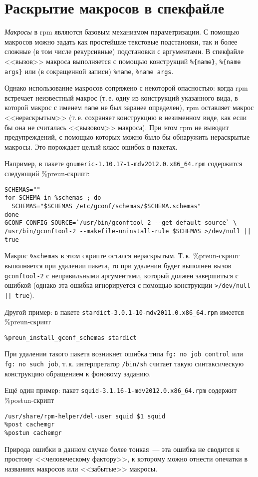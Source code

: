 \documentclass[russian,a4paper,12pt,titlepage]{article}
\begin{document}
\section{Раскрытие макросов в спекфайле}
\textit{Макросы} в rpm являются базовым механизмом параметризации.  С помощью
макросов можно задать как простейшие текстовые подстановки, так и более сложные
(в том числе рекурсивные) подстановки с аргументами.  В спекфайле <<вызов>> макроса
выполняется с помощью конструкций \verb|%{name}|, \verb|%{name args}| или (в сокращенной записи)
\verb|%name|, \verb|%name args|.

Однако использование макросов сопряжено с некоторой опасностью: когда rpm встречает неизвестный макрос
(т.\,е. одну из конструкций указанного вида, в которой макрос с именем \verb|name| не был заранее определен),
rpm оставляет макрос <<нераскрытым>> (т.\,е. сохраняет конструкцию в незименном виде, как если бы она не считалась
<<вызовом>> макроса).  При этом rpm не выводит предупреждений, с помощью которых можно было бы обнаружить
нераскрытые макросы.  Это порождает целый класс ошибок в пакетах.

Например, в пакете \verb|gnumeric-1.10.17-1-mdv2012.0.x86_64.rpm| содержится следующий \%preun-скрипт:
\begin{verbatim}
SCHEMAS=""
for SCHEMA in %schemas ; do
  SCHEMAS="$SCHEMAS /etc/gconf/schemas/$SCHEMA.schemas"
done
GCONF_CONFIG_SOURCE=`/usr/bin/gconftool-2 --get-default-source` \
/usr/bin/gconftool-2 --makefile-uninstall-rule $SCHEMAS >/dev/null || true
\end{verbatim}
Макрос \verb|%schemas| в этом скрипте остался нераскрытым.  Т.\,к. \%preun-скрипт
выполняется при удалении пакета, то при удалении будет выполнен вызов \verb|gconftool-2|
с неправильными аргументами, который должен завершиться с ошибкой (однако эта ошибка игнорируется
с помощью конструкции \texttt{>/dev/null || true}).

Другой пример: в пакете \verb|stardict-3.0.1-10-mdv2011.0.x86_64.rpm| имеется \%preun-скрипт
\begin{verbatim}
%preun_install_gconf_schemas stardict
\end{verbatim}
При удалении такого пакета возникнет ошибка типа \texttt{fg: no job control} или \texttt{fg: no such job},
т.\,к. интерпретатор \verb|/bin/sh| считает такую синтаксическую конструкцию обращением к фоновому заданию.

Ещё один пример: пакет \verb|squid-3.1.16-1-mdv2012.0.x86_64.rpm| содержит \%postun-скрипт
\begin{verbatim}
/usr/share/rpm-helper/del-user squid $1 squid
%post cachemgr
%postun cachemgr
\end{verbatim}
Природа ошибки в данном случае более тонкая~--- эта ошибка не сводится к простому <<человеческому фактору>>,
к которому можно отнести опечатки в названиях макросов или <<забытые>> макросы.
\end{document}
